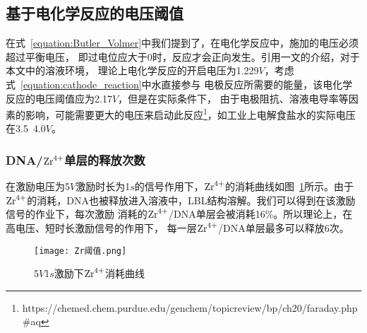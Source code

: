 \subsection{基于电化学反应的电压阈值}

在式~\ref{equation:Butler_Volmer}中我们提到了，在电化学反应中，施加的电压必须超过平衡电压，
即过电位应大于0时，反应才会正向发生。引用\parencite{C9RP00218A}一文的介绍，对于本文中的溶液环境，
理论上电化学反应的开启电压为1.229$V$，考虑式~\ref{equation:cathode_reaction}中水直接参与
电极反应所需要的能量，该电化学反应的电压阈值应为2.17$V$，但是在实际条件下，
由于电极阻抗、溶液电导率等因素的影响，可能需要更大的电压来启动此反应\footnote{
    https://chemed.chem.purdue.edu/genchem/topicreview/bp/ch20/faraday.php\#aq
}，如工业上电解食盐水的实际电压在3.5~4.0$V$。

\subsubsection{DNA/$\ce{Zr^4+}$单层的释放次数}
在激励电压为5$V$激励时长为1$s$的信号作用下，$\ce{Zr^4+}$的消耗曲线如图~\ref{5_1_Zr曲线}所示。由于
$\ce{Zr^4+}$的消耗，DNA也被释放进入溶液中，LBL结构溶解。我们可以得到在该激励信号的作业下，每次激励
消耗的$\ce{Zr^4+}$/DNA单层会被消耗16\%。所以理论上，在高电压、短时长激励信号的作用下，
每一层$\ce{Zr^4+}$/DNA单层最多可以释放6次。

\begin{figure}[H]
    \centering
    \texttt{[image: Zr阈值.png]}
    \caption{5$V$1$s$激励下$\ce{Zr^4+}$消耗曲线}
    \label{5_1_Zr曲线}
\end{figure}



